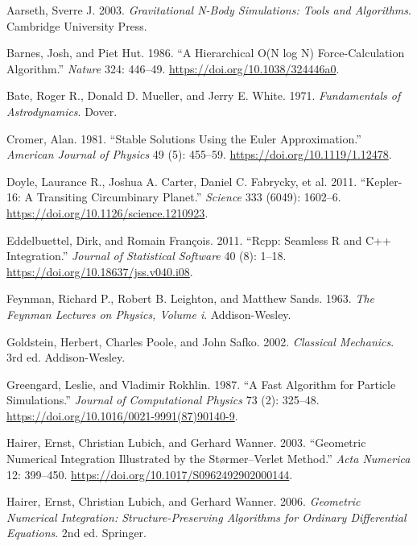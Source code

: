 \documentclass[
  10.5pt,
  letterpaper,
]{scrbook}
\newlength{\cslhangindent}
\newenvironment{CSLReferences}[2] %
 {\begin{list}{}{%
  \setlength{\itemindent}{0pt}
  \setlength{\leftmargin}{0pt}
  \setlength{\parsep}{0pt}
  \ifodd #1
   \setlength{\leftmargin}{\cslhangindent}
   \setlength{\itemindent}{-1\cslhangindent}
  \fi
  \setlength{\itemsep}{#2\baselineskip}}}
 {\end{list}}
\theoremstyle{plain}
\theoremstyle{remark}
\begin{document}
\protect{}\label{refs}
\begin{CSLReferences}{1}{1}
Aarseth, Sverre J. 2003. \emph{Gravitational {N}-Body Simulations: Tools
and Algorithms}. Cambridge University Press.

Barnes, Josh, and Piet Hut. 1986. {``A Hierarchical {O(N log N)}
Force-Calculation Algorithm.''} \emph{Nature} 324: 446--49.
\url{https://doi.org/10.1038/324446a0}.

Bate, Roger R., Donald D. Mueller, and Jerry E. White. 1971.
\emph{Fundamentals of Astrodynamics}. Dover.

Cromer, Alan. 1981. {``Stable Solutions Using the {Euler}
Approximation.''} \emph{American Journal of Physics} 49 (5): 455--59.
\url{https://doi.org/10.1119/1.12478}.

{Doyle, Laurance R., Joshua A. Carter, Daniel C. Fabrycky, et al.} 2011.
{``{Kepler-16}: A Transiting Circumbinary Planet.''} \emph{Science} 333
(6049): 1602--6. \url{https://doi.org/10.1126/science.1210923}.

Eddelbuettel, Dirk, and Romain François. 2011. {``{Rcpp}: Seamless {R}
and {C++} Integration.''} \emph{Journal of Statistical Software} 40 (8):
1--18. \url{https://doi.org/10.18637/jss.v040.i08}.

Feynman, Richard P., Robert B. Leighton, and Matthew Sands. 1963.
\emph{The Feynman Lectures on Physics, Volume i}. Addison-Wesley.

Goldstein, Herbert, Charles Poole, and John Safko. 2002. \emph{Classical
Mechanics}. 3rd ed. Addison-Wesley.

Greengard, Leslie, and Vladimir Rokhlin. 1987. {``A Fast Algorithm for
Particle Simulations.''} \emph{Journal of Computational Physics} 73 (2):
325--48. \url{https://doi.org/10.1016/0021-9991(87)90140-9}.

Hairer, Ernst, Christian Lubich, and Gerhard Wanner. 2003. {``Geometric
Numerical Integration Illustrated by the {St{ø}rmer--Verlet} Method.''}
\emph{Acta Numerica} 12: 399--450.
\url{https://doi.org/10.1017/S0962492902000144}.

Hairer, Ernst, Christian Lubich, and Gerhard Wanner. 2006.
\emph{Geometric Numerical Integration: Structure-Preserving Algorithms
for Ordinary Differential Equations}. 2nd ed. Springer.


\end{CSLReferences}
\end{document}

